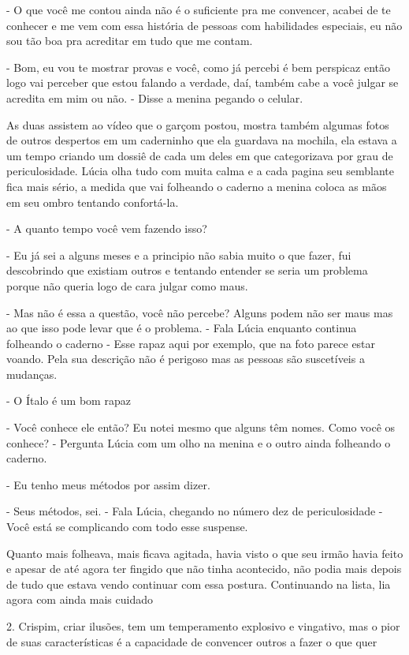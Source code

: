 - O que você me contou ainda não é o suficiente pra me convencer, acabei de te conhecer e me vem com essa história de pessoas com habilidades especiais, eu não sou tão boa pra acreditar em tudo que me contam.

- Bom, eu vou te mostrar provas e você, como já percebi é bem perspicaz então logo vai perceber que estou falando a verdade, daí, também cabe a você julgar se acredita em mim ou não. - Disse a menina pegando o celular.

As duas assistem ao vídeo que o garçom postou, mostra também algumas fotos de outros despertos em um caderninho que ela guardava na mochila, ela estava a um tempo criando um dossiê de cada um deles em que categorizava por grau de periculosidade. Lúcia olha tudo com  muita calma e a cada pagina seu semblante fica mais sério, a medida que vai folheando o caderno a menina coloca as mãos em seu ombro tentando confortá-la.

- A quanto tempo você vem fazendo isso?

- Eu já sei a alguns meses e a principio não sabia muito o que fazer, fui descobrindo que existiam outros e tentando entender se seria um problema porque não queria logo de cara julgar como maus.

- Mas não é essa a questão, você não percebe? Alguns podem não ser maus mas ao que isso pode levar que é o problema. - Fala Lúcia enquanto continua folheando o caderno - Esse rapaz aqui por exemplo, que na foto parece estar voando. Pela sua descrição não é perigoso mas as pessoas são suscetíveis a mudanças.

- O Ítalo é um bom rapaz

- Você conhece ele então? Eu notei mesmo que alguns têm nomes. Como você os conhece? - Pergunta Lúcia com um olho na menina e o outro ainda folheando o caderno.

- Eu tenho meus métodos por assim dizer.

- Seus métodos, sei. - Fala Lúcia, chegando no número dez de periculosidade - Você está se complicando com todo esse suspense.


Quanto mais folheava, mais ficava agitada, havia visto o que seu irmão havia feito e apesar de até agora ter fingido que não tinha acontecido, não podia mais depois de tudo que estava vendo continuar com essa postura.
Continuando na lista, lia agora com ainda mais cuidado

2. Crispim, criar ilusões, tem um temperamento explosivo e vingativo, mas o pior de suas  características é a capacidade de convencer outros a fazer o que quer

